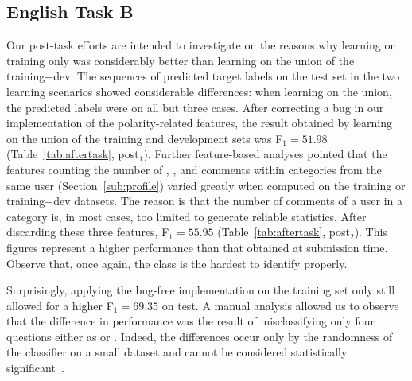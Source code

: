  

 
\subsection{English Task B} \label{sec:discussionb}

Our post-task efforts are intended to investigate on the reasons why learning on 
training only was considerably better than learning on the union of the 
training+dev. The sequences of predicted target labels on the test set in the 
two learning scenarios showed considerable differences: when learning on the 
union, the predicted labels were \yes on all but three cases. After correcting a 
bug in our implementation of the polarity-related features, the result obtained 
by learning on the union of the training and development sets was F$_1=51.98$ 
(Table~\ref{tab:aftertask}, post$_1$). Further feature-based analyses pointed 
that the features counting the number of \good, \bad, and \pot comments within 
categories from the same user (\cf Section~\ref{sub:profile}) varied greatly 
when computed on the training or training+dev datasets. The reason is that the 
number of comments of a user in a category is, in most cases, too limited to 
generate reliable statistics. After discarding these three features, F$_1 = 
55.95$ (Table~\ref{tab:aftertask}, post$_2$). This figures represent a higher 
performance than that obtained at submission time. Observe that, once again, the 
\unsure class is the hardest to identify properly.

Surprisingly, applying the bug-free implementation on the training set only 
still allowed for a higher F$_1 =69.35$ on test.
A manual analysis allowed us to observe that the difference in performance was 
the result of misclassifying only four questions either as \yes or \unsure. 
Indeed, the differences occur only by the randomness of the classifier on 
a small dataset and cannot be considered statistically 
significant~\cite{Marquez-EtAl:2015:SemEval}. 

